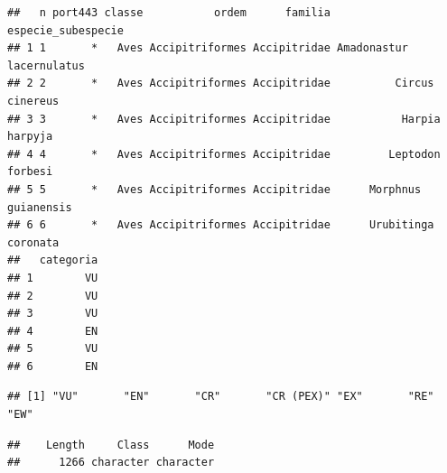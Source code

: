 \documentclass[
]{article}
\newenvironment{Shaded}{\begin{snugshade}}{\end{snugshade}}
\newcommand{\AttributeTok}[1]{\textcolor[rgb]{0.77,0.63,0.00}{#1}}
\newcommand{\CommentTok}[1]{\textcolor[rgb]{0.56,0.35,0.01}{\textit{#1}}}
\newcommand{\ConstantTok}[1]{\textcolor[rgb]{0.00,0.00,0.00}{#1}}
\newcommand{\FunctionTok}[1]{\textcolor[rgb]{0.00,0.00,0.00}{#1}}
\newcommand{\NormalTok}[1]{#1}
\newcommand{\OtherTok}[1]{\textcolor[rgb]{0.56,0.35,0.01}{#1}}
\newcommand{\SpecialCharTok}[1]{\textcolor[rgb]{0.00,0.00,0.00}{#1}}
\newcommand{\StringTok}[1]{\textcolor[rgb]{0.31,0.60,0.02}{#1}}
\begin{document}
\begin{verbatim}
##   n port443 classe           ordem      familia       especie_subespecie
## 1 1       *   Aves Accipitriformes Accipitridae Amadonastur lacernulatus
## 2 2       *   Aves Accipitriformes Accipitridae          Circus cinereus
## 3 3       *   Aves Accipitriformes Accipitridae           Harpia harpyja
## 4 4       *   Aves Accipitriformes Accipitridae         Leptodon forbesi
## 5 5       *   Aves Accipitriformes Accipitridae      Morphnus guianensis
## 6 6       *   Aves Accipitriformes Accipitridae      Urubitinga coronata
##   categoria
## 1        VU
## 2        VU
## 3        VU
## 4        EN
## 5        VU
## 6        EN
\end{verbatim}

\begin{Shaded}
\end{Shaded}

\begin{verbatim}
## [1] "VU"       "EN"       "CR"       "CR (PEX)" "EX"       "RE"       "EW"
\end{verbatim}

\begin{Shaded}
\end{Shaded}

\begin{verbatim}
##    Length     Class      Mode 
##      1266 character character
\end{verbatim}

\begin{Shaded}
\end{Shaded}
\end{document}

